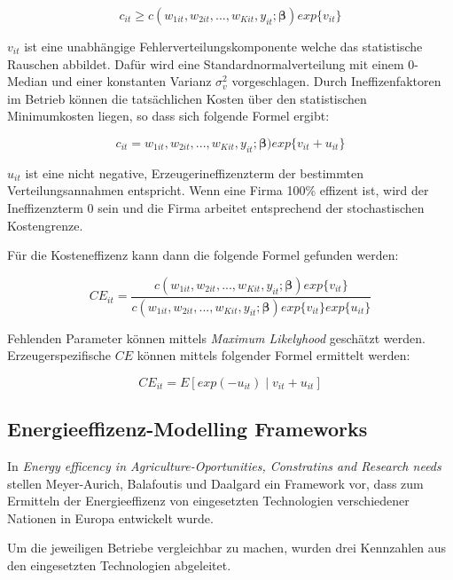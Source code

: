 \begin{equation}
	c_{it} \geq c(w_{1it},w_{2it},...,w_{Kit},y_{it};\boldsymbol{\beta})exp\{v_{it}\}
\end{equation}

$v_{it}$ ist eine unabhängige Fehlerverteilungskomponente welche das statistische Rauschen abbildet. Dafür wird eine Standardnormalverteilung mit einem 0-Median und einer konstanten Varianz $\sigma_{v}^2$ vorgeschlagen. Durch Ineffizenfaktoren im Betrieb können die tatsächlichen Kosten über den statistischen Minimumkosten liegen, so dass sich folgende Formel ergibt:

\begin{equation}
	c_{it} = w_{1it},w_{2it},...,w_{Kit},y_{it};\boldsymbol{\beta})exp\{v_{it} + u_{it}\}
\end{equation}

$u_{it}$ ist eine nicht negative, Erzeugerineffizenzterm der bestimmten Verteilungsannahmen entspricht. Wenn eine Firma 100\% effizent ist, wird der Ineffizenzterm 0 sein und die Firma arbeitet entsprechend der stochastischen Kostengrenze.

Für die Kosteneffizenz kann dann die folgende Formel gefunden werden:

\begin{equation}
	CE_{it} = \frac{c(w_{1it},w_{2it},...,w_{Kit},y_{it};\boldsymbol{\beta})exp\{v_{it}\}}{c(w_{1it},w_{2it},...,w_{Kit},y_{it};\boldsymbol{\beta})exp\{v_{it}\}exp\{u_{it}\}}
\end{equation}

Fehlenden Parameter können mittels \textit{Maximum Likelyhood} geschätzt werden. Erzeugerspezifische $CE$ können mittels folgender Formel ermittelt werden:\cite{conf:Jian2013}

\begin{equation}
	CE_{it}=E[exp(-u_{it}) \mid v_{it}+u_{it}]
\end{equation}

\subsection{Energieeffizenz-Modelling Frameworks}
In \textit{Energy efficency in Agriculture-Oportunities, Constratins and Research needs}\cite{jour:Meyer-Aurich2013} stellen Meyer-Aurich, Balafoutis und Daalgard ein Framework vor, dass zum Ermitteln der Energieeffizenz von eingesetzten Technologien verschiedener Nationen in Europa entwickelt wurde.

Um die jeweiligen Betriebe vergleichbar zu machen, wurden drei Kennzahlen aus den eingesetzten Technologien abgeleitet.

